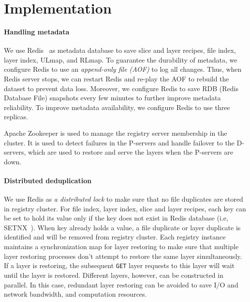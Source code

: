 \section{Implementation}
\label{sec:impl}

\paragraph{Handling metadata}
We use Redis~\cite{redis} as metadata database to save slice and layer recipes, file index, layer index, ULmap, and RLmap.
To guarantee the durability of metadata, 
we configure Redis to use an \emph{append-only file (AOF)} to log all changes.
Thus, when Redis server stops, we can restart Redis and re-play the AOF to rebuild the dataset to prevent data loss.
Moreover, we configure Redis to save RDB (Redis Database File) snapshots every few minutes to further improve metadata reliability. 
To improve metadata availability, 
we configure Redis to use three replicas.

Apache Zookeeper is used to manage the registry server membership in the cluster. 
It is used to detect failures in the P-servers and handle failover to the D-servers, 
which are used to restore and serve the layers when the P-servers are down.

\paragraph{Distributed deduplication}
We use Redis as \emph{a distributed lock} 
to make sure that no file duplicates are stored in registry cluster.
For file index, layer index, slice and layer recipes, 
each key can be set to hold its value only if 
the key does not exist in Redis database (i.e, SETNX~\cite{SETNX}).
When key already holds a value, a file duplicate or 
layer duplicate is identified and will be removed from registry cluster. 
Each registry instance 
maintains a synchronization map 
for layer restoring to make sure that multiple layer restoring processes 
don't attempt to restore the same layer simultaneously.
If a layer is restoring, the subsequent
\texttt{GET} layer requests to this layer will wait until the layer is restored.
 Different layers, however, can be constructed in parallel. 
 In this case, redundant layer restoring can be avoided to save I/O and network bandwidth, and computation resources.
 
